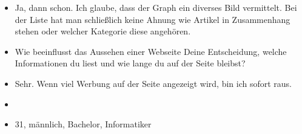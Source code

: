 {\begin{itemize}[]
                  Vielleicht auch im Vergleich zur Darstellungsform mit Listen?
            \item {} Ja, dann schon. Ich glaube, dass der Graph ein diverses Bild vermittelt.
                  Bei der Liste hat man schließlich keine Ahnung wie Artikel in Zusammenhang stehen oder welcher Kategorie diese angehören.
            \item {} Wie beeinflusst das Aussehen einer Webseite Deine Entscheidung, welche Informationen du liest und wie lange du auf der Seite bleibst?
            \item {} Sehr. Wenn viel Werbung auf der Seite angezeigt wird, bin ich sofort raus.
            \item {}
            \item {} 31, männlich, Bachelor, Informatiker
      \end{itemize}}
\nolinenumbers
